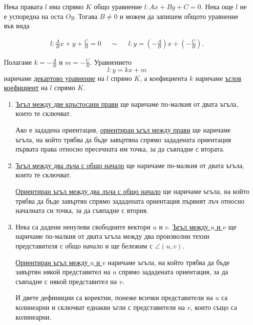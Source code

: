 \documentclass[numbers=endperiod, DIV=15]{scrartcl}
\begin{document}
\begin{definition}
  Нека правата $l$ има спрямо $K$ общо уравнение $l: Ax + By + C = 0$. Нека още $l$ не е успоредна на оста $Oy$. Тогава $B \neq 0$ и можем да запишем общото уравнение във вида

  \begin{align*}
    l: \frac A B x + y + \frac C B = 0
    &&\sim&&
    l: y = \left(-\frac A B \right) x + \left(-\frac C B \right).
  \end{align*}

  Полагаме $k = -\frac A B$ и $m = -\frac C B$. Уравнението
  \begin{displaymath}
    l: y = kx + m
  \end{displaymath}
  наричаме \underline{декартово уравнение} на $l$ спрямо $K$, а коефициента $k$ наричаме \underline{ъглов коефициент} на $l$ спрямо $K$.
\end{definition}

\begin{definition}
  \mbox{}
  \begin{enumerate}
    \item \underline{Ъгъл между две кръстосани прави} ще наричаме по-малкия от двата ъгъла, които те сключват.

    Ако е зададена ориентация, \underline{ориентиран ъгъл между прави} ще наричаме ъгъла, на който трябва да бъде завъртяна спрямо зададената ориентация първата права относно пресечната им точка, за да съвпадне с втората.

    \item \underline{Ъгъл между два лъча с общо начало} ще наричаме по-малкия от двата ъгъла, които те сключват.

    \underline{Ориентиран ъгъл между два лъча с общо начало} ще наричаме ъгъла, на който трябва да бъде завъртян спрямо зададената ориентация първият лъч относно началната си точка, за да съвпадне с втория.

    \item Нека са дадени ненулеви свободните вектори $u$ и $v$. \underline{Ъгъл между $u$ и $v$} ще наричаме по-малкия от двата ъгъла между два произволни техни представителя с общо начало и ще бележим с $\angle(u, v)$.

    \underline{Ориентиран ъгъл между $u$ и $v$} наричаме ъгъла, на който трябва да бъде завъртян някой представител на $u$ спрямо зададената ориентация, за да съвпадне с някой представител на $v$.

    И двете дефиниции са коректни, понеже всички представители на $u$ са колинеарни и сключват еднакви ъгли с представители на $v$, които също са колинеарни.
  \end{enumerate}

\end{definition}
\end{document}
